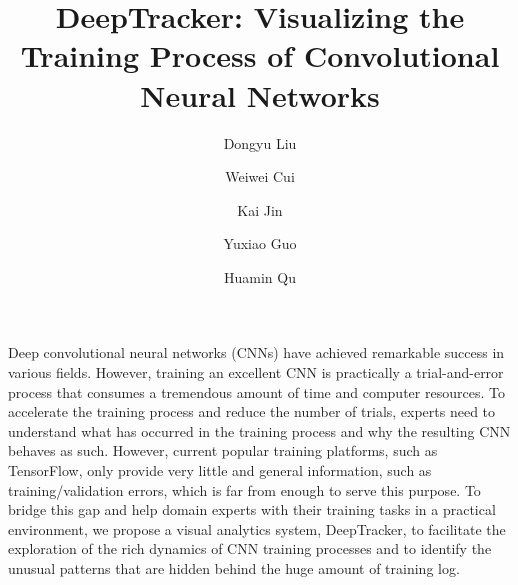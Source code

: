 \documentclass[format=acmsmall, review=false, screen=true]{acmart}
\newcommand{\name}{{DeepTracker}\xspace}
\begin{document}
	\title{\name: Visualizing the Training Process of Convolutional Neural Networks}
	\author{Dongyu Liu}
	\author{Weiwei Cui}
	\author{Kai Jin}
	\author{Yuxiao Guo}
	\author{Huamin Qu}

Deep convolutional neural networks (CNNs) have achieved remarkable success in various fields.
However, training an excellent CNN is practically a trial-and-error process that consumes a tremendous amount of time and computer resources.
To accelerate the training process and reduce the number of trials, experts need to understand what has occurred in the training process and why the resulting CNN behaves as such.
However, current popular training platforms, such as TensorFlow, only provide very little and general information, such as training/validation errors, which is far from enough to serve this purpose.
To bridge this gap and help domain experts with their training tasks in a practical environment, we propose a visual analytics system, \name, to facilitate the exploration of the rich dynamics of CNN training processes and to identify the unusual patterns that are hidden behind the huge amount of training log.
\end{document}
